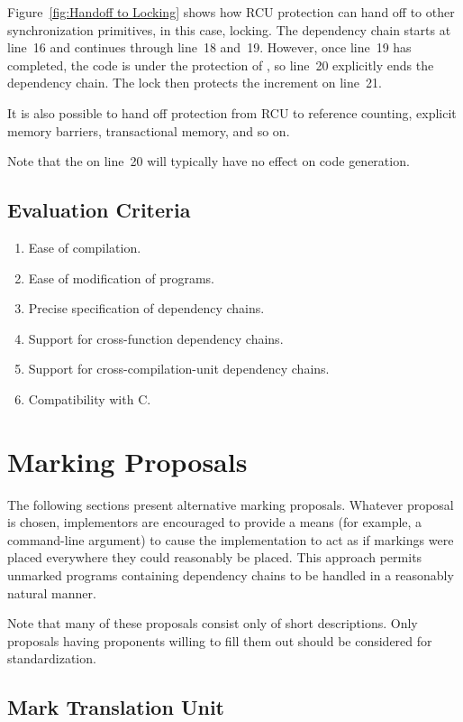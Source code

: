 \documentclass[letterpaper,twocolumn,10pt]{article}
\begin{document}
Figure~\ref{fig:Handoff to Locking}
shows how RCU protection can hand off to other synchronization
primitives, in this case, locking.
The dependency chain starts at line~16 and continues through line~18
and~19.
However, once line~19 has completed, the code is under the protection
of , so line~20 explicitly ends the dependency chain.
The lock then protects the increment on line~21.

It is also possible to hand off protection from RCU to reference counting,
explicit memory barriers, transactional memory, and so on.

Note that the  on line~20 will typically have
no effect on code generation.

\subsection{Evaluation Criteria}
\label{sec:Evaluation Criteria}

\begin{enumerate}
\item	Ease of compilation.
\item	Ease of modification of programs.
\item	Precise specification of dependency chains.
\item	Support for cross-function dependency chains.
\item	Support for cross-compilation-unit dependency chains.
\item	Compatibility with C.
\end{enumerate}

\section{Marking Proposals}
\label{sec:Marking Proposals}

The following sections present alternative marking proposals.
Whatever proposal is chosen, implementors are encouraged to provide
a means (for example, a command-line argument) to cause the
implementation to act as if markings were placed everywhere they
could reasonably be placed.
This approach permits unmarked programs containing dependency chains
to be handled in a reasonably natural manner.

Note that many of these proposals consist only of short descriptions.
Only proposals having proponents willing to fill them out should be
considered for standardization.

\subsection{Mark Translation Unit}
\label{sec:Mark Translation Unit}
\end{document}
